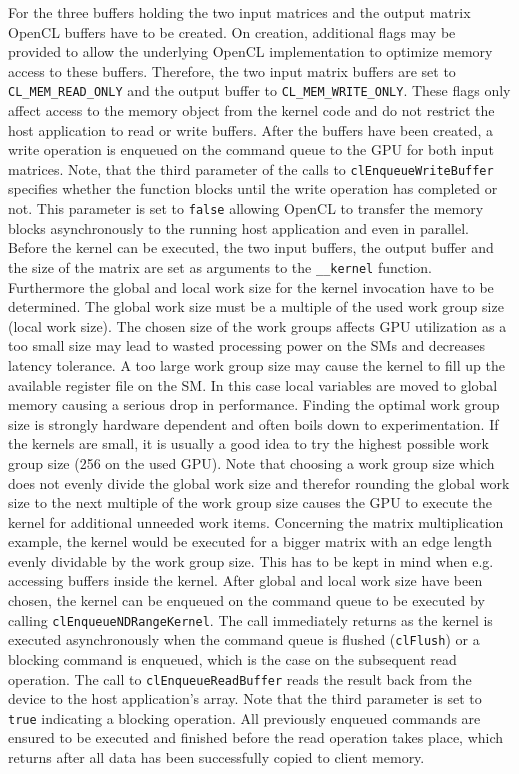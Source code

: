 For the three buffers holding the two input matrices and the output matrix OpenCL buffers have to be created. On creation, additional flags may be provided to allow the underlying OpenCL implementation to optimize memory access to these buffers. Therefore, the two input matrix buffers are set to \lstinline!CL_MEM_READ_ONLY! and the output buffer to \lstinline!CL_MEM_WRITE_ONLY!. These flags only affect access to the memory object from the kernel code and do not restrict the host application to read or write buffers.
After the buffers have been created, a write operation is enqueued on the command queue to the GPU for both input matrices. Note, that the third parameter of the calls to \lstinline!clEnqueueWriteBuffer! specifies whether the function blocks until the write operation has completed or not. This parameter is set to \lstinline!false! allowing OpenCL to transfer the memory blocks asynchronously to the running host application and even in parallel.
Before the kernel can be executed, the two input buffers, the output buffer and the size of the matrix are set as arguments to the \lstinline!__kernel! function. Furthermore the global and local work size for the kernel invocation have to be determined. The global work size must be a multiple of the used work group size (local work size). The chosen size of the work groups affects GPU utilization as a too small size may lead to wasted processing power on the SMs and decreases latency tolerance. A too large work group size may cause the kernel to fill up the available register file on the SM. In this case local variables are moved to global memory causing a serious drop in performance. Finding the optimal work group size is strongly hardware dependent and often boils down to experimentation. If the kernels are small, it is usually a good idea to try the highest possible work group size (256 on the used GPU).
Note that choosing a work group size which does not evenly divide the global work size and therefor rounding the global work size to the next multiple of the work group size causes the GPU to execute the kernel for additional unneeded work items. Concerning the matrix multiplication example, the kernel would be executed for a bigger matrix with an edge length evenly dividable by the work group size. This has to be kept in mind when e.g. accessing buffers inside the kernel.
After global and local work size have been chosen, the kernel can be enqueued on the command queue to be executed by calling \lstinline!clEnqueueNDRangeKernel!. The call immediately returns as the kernel is executed asynchronously when the command queue is flushed (\lstinline!clFlush!) or a blocking command is enqueued, which is the case on the subsequent read operation. The call to \lstinline!clEnqueueReadBuffer! reads the result back from the device to the host application's array. Note that the third parameter is set to \lstinline!true! indicating a blocking operation. All previously enqueued commands are ensured to be executed and finished before the read operation takes place, which returns after all data has been successfully copied to client memory.


